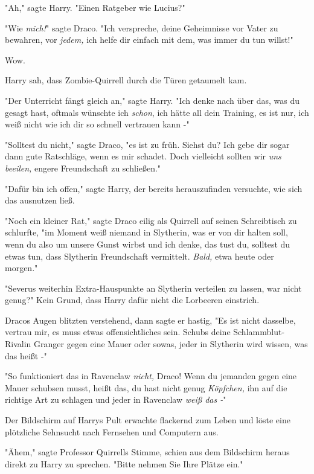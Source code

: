 {"Ah," sagte Harry. "Einen Ratgeber wie Lucius?"

"Wie \emph{mich!}" sagte Draco. "Ich verspreche, deine Geheimnisse vor Vater zu bewahren, vor \emph{jedem,} ich helfe dir einfach mit dem, was immer du tun willst!"

Wow.

Harry sah, dass Zombie-Quirrell durch die Türen getaumelt kam.

"Der Unterricht fängt gleich an," sagte Harry. "Ich denke nach über das, was du gesagt hast, oftmals wünschte ich \emph{schon}, ich hätte all dein Training, es ist nur, ich weiß nicht wie ich dir so schnell vertrauen kann -"

"Solltest du nicht," sagte Draco, "es ist zu früh. Siehst du? Ich gebe dir sogar dann gute Ratschläge, wenn es mir schadet. Doch vielleicht sollten wir \emph{uns beeilen,} engere Freundschaft zu schließen."

"Dafür bin ich offen," sagte Harry, der bereits herauszufinden versuchte, wie sich das ausnutzen ließ.

"Noch ein kleiner Rat," sagte Draco eilig als Quirrell auf seinen Schreibtisch zu schlurfte, "im Moment weiß niemand in Slytherin, was er von dir halten soll, wenn du also um unsere Gunst wirbst und ich denke, das tust du, solltest du etwas tun, dass Slytherin Freundschaft vermittelt. \emph{Bald,} etwa heute oder morgen."

"Severus weiterhin Extra-Hauspunkte an Slytherin verteilen zu lassen, war nicht genug?" Kein Grund, dass Harry dafür nicht die Lorbeeren einstrich.

Dracos Augen blitzten verstehend, dann sagte er hastig, "Es ist nicht dasselbe, vertrau mir, es muss etwas offensichtliches sein. Schubs deine Schlammblut-Rivalin Granger gegen eine Mauer oder sowas, jeder in Slytherin wird wissen, was das heißt -"

"So funktioniert das in Ravenclaw \emph{nicht,} Draco! Wenn du jemanden gegen eine Mauer schubsen musst, heißt das, du hast nicht genug \emph{Köpfchen,} ihn auf die richtige Art zu schlagen und jeder in Ravenclaw \emph{weiß das -}"

Der Bildschirm auf Harrys Pult erwachte flackernd zum Leben und löste eine plötzliche Sehnsucht nach Fernsehen und Computern aus.

"Ähem," sagte Professor Quirrells Stimme, schien aus dem Bildschirm heraus direkt zu Harry zu sprechen. "Bitte nehmen Sie Ihre Plätze ein."

\later

}
